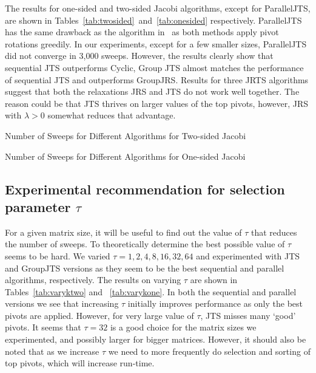 \documentclass[10pt, conference, compsocconf]{IEEEtran}
\begin{document}
The results for one-sided and two-sided Jacobi algorithms, except for ParallelJTS, are shown in Tables~\ref{tab:twosided}~and~\ref{tab:onesided} respectively. ParallelJTS has the same drawback as the algorithm in~\cite{strumpen2003stream} as both methods apply pivot rotations greedily. In our experiments, except for a few smaller sizes, ParallelJTS did not converge in 3,000 sweeps. However, the results clearly show that sequential JTS outperforms Cyclic, Group JTS almost matches the performance of sequential JTS and outperforms GroupJRS. Results for three JRTS algorithms suggest that both the relaxations JRS and JTS do not work well together. The reason could be that JTS thrives on larger values of the top pivots, however, JRS with $\lambda > 0$ somewhat reduces that advantage.

\begin{table}
  \centering
  \caption{Number of Sweeps for Different Algorithms for Two-sided Jacobi}
  \label{tab:twosided}
  
\end{table}


\begin{table}
  \centering
  \caption{Number of Sweeps for Different Algorithms for One-sided Jacobi}
  \label{tab:onesided}
  
\end{table}

\subsection{Experimental recommendation for selection parameter $\tau$}

For a given matrix size, it will be useful to find out the value of $\tau$ that reduces the number of sweeps. To theoretically determine the best possible value of $\tau$ seems to be hard. We varied $\tau=1,2,4,8,16,32,64$ and experimented with JTS and GroupJTS versions as they seem to be the best sequential and parallel algorithms, respectively. The results on varying $\tau$ are shown in Tables~\ref{tab:varyktwo} and ~\ref{tab:varykone}. In both the sequential and parallel versions we see that  increasing $\tau$ initially improves performance as only the best pivots are applied. However, for very large value of $\tau$, JTS misses many `good' pivots. It seems that $\tau=32$ is a good choice for the matrix sizes we experimented, and possibly larger for bigger matrices. However, it should also be noted that as we increase $\tau$ we need to more frequently do selection and sorting of top pivots, which will increase run-time. 
\end{document}
